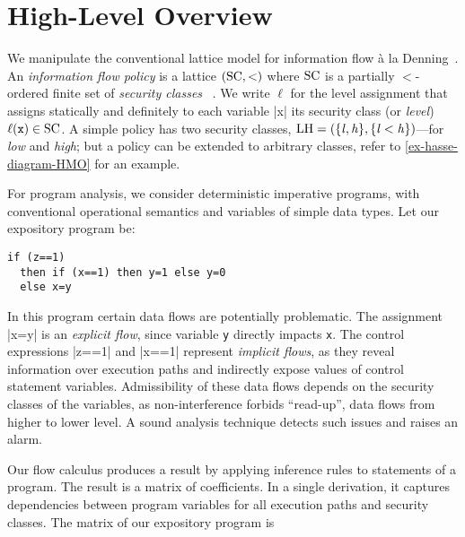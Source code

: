 \documentclass[conference]{IEEEtran}
\begin{document}
\section{High-Level Overview}
\label{sec:overview}

We manipulate the conventional lattice model for information flow à la Denning~\cite{Denning76}.
An \emph{information flow policy} is a lattice \((\mathrm{SC}, <)\) where \(\mathrm{SC}\) is a partially \(<\)-ordered finite set of \emph{security classes}%
~\cite{VolpanoI1996}.
We write \(\ell\) for the level assignment that assigns statically and definitely to each variable \prc|x| its security class (or \emph{level}) \(\ell(\mathtt{x}) \in \mathrm{SC}\).
A simple policy has two security classes, \eg
\(\mathrm{LH}=(\{\mathit{l}, \mathit{h}\}, \{\mathit{l} < \mathit{h}\})\)---for \emph{low} and \emph{high};
but a policy can be extended to arbitrary classes, refer to \autoref{ex-hasse-diagram-HMO} for an example.

For program analysis, we consider deterministic imperative programs, with conventional operational semantics and variables of simple data types.
Let our expository program be:

\begin{lstlisting}
if (z==1)
  then if (x==1) then y=1 else y=0
  else x=y
\end{lstlisting}

In this program certain data flows are potentially problematic. %
The assignment \prc|x=y| is an \emph{explicit flow}, since variable \texttt{y} directly impacts \texttt{x}.
The control expressions \prc|z==1| and \prc|x==1| represent \emph{implicit flows}, as they
reveal information over execution paths and indirectly expose values of control statement variables.
Admissibility of these data flows depends on the security classes of the variables,
as non-interference forbids \enquote{read-up}, \ie data flows from higher to lower level.
A sound analysis technique detects such issues and raises an alarm.

Our flow calculus produces a result by applying inference rules to statements of a program.
The result is a matrix of coefficients.
In a single derivation, it captures dependencies between program variables for all execution paths and security classes.
The matrix of our expository program is
\end{document}
